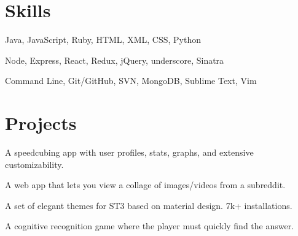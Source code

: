 \documentclass[]{deedy-resume-openfont}
\begin{document}
\begin{minipage}[t]{.3\textwidth}
\section{Skills}
Java, JavaScript, Ruby, HTML, XML, CSS, Python

\vspace{2mm}

Node, Express, React, Redux, jQuery, underscore, Sinatra

\vspace{2mm}

Command Line, Git/GitHub, SVN, MongoDB, Sublime Text, Vim

\end{minipage}
\hfill
\begin{minipage}[t]{.65\textwidth}
\section{Projects}
A speedcubing app with user profiles, stats, graphs, and extensive customizability.

\vspace{2mm}

A web app that lets you view a collage of images/videos from a subreddit.

\vspace{2mm}

A set of elegant themes for ST3 based on material design. 7k+ installations.

\vspace{2mm}

A cognitive recognition game where the player must quickly find the answer.

\end{minipage}
\end{document}
